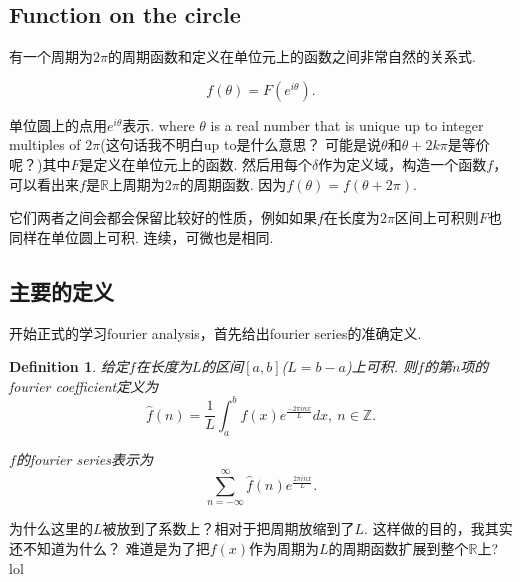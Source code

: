 \documentclass{article}
\newtheorem{definition}[theorem]{Definition}
\begin{document}
\subsection{Function on the circle}

有一个周期为$2\pi$的周期函数和定义在单位元上的函数之间非常自然的关系式.

$$
f(\theta) = F(e^{i\theta}).
$$

单位圆上的点用$e^{i\theta}$表示. where $\theta$ is a real number
that is unique up to integer multiples of $2\pi$(这句话我不明白up to是什么意思？ 可能是说$\theta$和$\theta + 2k\pi$是等价呢？)其中$F$是定义在单位元上的函数. 然后用每个$\delta$作为定义域，构造一个函数$f$，可以看出来$f$是$\mathbb{R}$上周期为$2\pi$的周期函数. 因为$f(\theta) = f(\theta + 2\pi).$

它们两者之间会都会保留比较好的性质，例如如果$f$在长度为$2\pi$区间上可积则$F$也同样在单位圆上可积. 连续，可微也是相同.

\subsection{主要的定义}
开始正式的学习fourier analysis，首先给出fourier series的准确定义. 

\begin{definition}
\rm 给定$f$在长度为$L$的区间$[a,b]$($L=b-a$)上可积. 则$f$的第$n$项的fourier coefficient定义为
$$
	\widehat{f}(n) = \frac{1}{L} \int_{a}^{b} f(x)e^\frac{{-2\pi inx}}{L}dx, \ n \in \mathbb{Z}.
$$

$f$的fourier series表示为
$$
\sum\limits_{n=-\infty}^{\infty} \widehat{f}(n)e^{\frac{2\pi inx}{L}}.
$$
\end{definition}

为什么这里的$L$被放到了系数上？相对于把周期放缩到了$L$. 这样做的目的，我其实还不知道为什么？ 难道是为了把$f(x)$作为周期为$L$的周期函数扩展到整个$\mathbb{R}$上? lol
 
\end{document}
